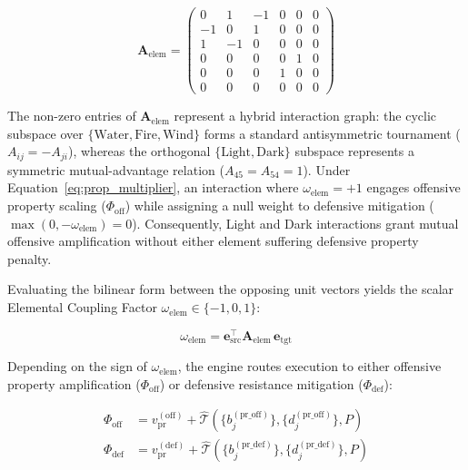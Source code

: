 \documentclass[twocolumn,10pt]{article}
\begin{document}
\begin{equation}
\label{eq:elem_matrix}
\mathbf{A}_{\text{elem}} = 
\begin{pmatrix}
0 & 1 & -1 & 0 & 0 & 0 \\
-1 & 0 & 1 & 0 & 0 & 0 \\
1 & -1 & 0 & 0 & 0 & 0 \\
0 & 0 & 0 & 0 & 1 & 0 \\
0 & 0 & 0 & 1 & 0 & 0 \\
0 & 0 & 0 & 0 & 0 & 0
\end{pmatrix}
\end{equation}

The non-zero entries of $\mathbf{A}_{\text{elem}}$ represent a hybrid interaction graph: the cyclic subspace over $\{\text{Water}, \text{Fire}, \text{Wind}\}$ forms a standard antisymmetric tournament ($A_{ij} = -A_{ji}$), whereas the orthogonal $\{\text{Light}, \text{Dark}\}$ subspace represents a symmetric mutual-advantage relation ($A_{45} = A_{54} = 1$). Under Equation~\ref{eq:prop_multiplier}, an interaction where $\omega_{\text{elem}} = +1$ engages offensive property scaling ($\Phi_{\text{off}}$) while assigning a null weight to defensive mitigation ($\max(0, -\omega_{\text{elem}}) = 0$). Consequently, Light and Dark interactions grant mutual offensive amplification without either element suffering defensive property penalty.

Evaluating the bilinear form between the opposing unit vectors yields the scalar Elemental Coupling Factor $\omega_{\text{elem}} \in \{-1, 0, 1\}$:

\begin{equation}
\label{eq:elem_coupling}
  \omega_{\text{elem}} = \mathbf{e}_{\text{src}}^\top \mathbf{A}_{\text{elem}} \, \mathbf{e}_{\text{tgt}}
\end{equation}


Depending on the sign of $\omega_{\text{elem}}$, the engine routes execution to either offensive property amplification ($\Phi_{\text{off}}$) or defensive resistance mitigation ($\Phi_{\text{def}}$):

\begin{equation}
\label{eq:prop_pools}
\begin{aligned}
  \Phi_{\text{off}} &= v_{\text{pr}}^{(\text{off})} + \hat{\mathcal{T}}\left(\{b_j^{(\text{pr\_off})}\}, \{d_j^{(\text{pr\_off})}\}, P\right) \\
  \Phi_{\text{def}} &= v_{\text{pr}}^{(\text{def})} + \hat{\mathcal{T}}\left(\{b_j^{(\text{pr\_def})}\}, \{d_j^{(\text{pr\_def})}\}, P\right)
\end{aligned}
\end{equation}
\end{document}

